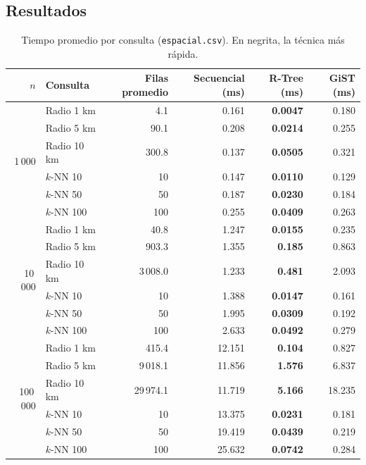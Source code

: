 \documentclass[11pt,a4paper]{article}
\begin{document}
\subsection{Resultados}

\begin{table}[H]
  \centering
  \small
  \begin{tabular}{@{}rlrrrr@{}}
    \toprule
    $n$ & Consulta & Filas promedio & Secuencial (ms) & R-Tree (ms) & GiST (ms) \\
    \midrule
    \multirow{6}{*}{1\,000}
      & Radio 1 km  & 4.1       & 0.161  & \textbf{0.0047} & 0.180 \\
      & Radio 5 km  & 90.1      & 0.208  & \textbf{0.0214} & 0.255 \\
      & Radio 10 km & 300.8     & 0.137  & \textbf{0.0505} & 0.321 \\
      & $k$-NN 10   & 10        & 0.147  & \textbf{0.0110} & 0.129 \\
      & $k$-NN 50   & 50        & 0.187  & \textbf{0.0230} & 0.184 \\
      & $k$-NN 100  & 100       & 0.255  & \textbf{0.0409} & 0.263 \\
    \midrule
    \multirow{6}{*}{10\,000}
      & Radio 1 km  & 40.8      & 1.247  & \textbf{0.0155} & 0.235 \\
      & Radio 5 km  & 903.3     & 1.355  & \textbf{0.185}  & 0.863 \\
      & Radio 10 km & 3\,008.0  & 1.233  & \textbf{0.481}  & 2.093 \\
      & $k$-NN 10   & 10        & 1.388  & \textbf{0.0147} & 0.161 \\
      & $k$-NN 50   & 50        & 1.995  & \textbf{0.0309} & 0.192 \\
      & $k$-NN 100  & 100       & 2.633  & \textbf{0.0492} & 0.279 \\
    \midrule
    \multirow{6}{*}{100\,000}
      & Radio 1 km  & 415.4     & 12.151 & \textbf{0.104}  & 0.827 \\
      & Radio 5 km  & 9\,018.1  & 11.856 & \textbf{1.576}  & 6.837 \\
      & Radio 10 km & 29\,974.1 & 11.719 & \textbf{5.166}  & 18.235 \\
      & $k$-NN 10   & 10        & 13.375 & \textbf{0.0231} & 0.181 \\
      & $k$-NN 50   & 50        & 19.419 & \textbf{0.0439} & 0.219 \\
      & $k$-NN 100  & 100       & 25.632 & \textbf{0.0742} & 0.284 \\
    \bottomrule
  \end{tabular}
  \caption{Tiempo promedio por consulta (\texttt{espacial.csv}). En negrita, la técnica más rápida.}
  \label{tab:espacial}
\end{table}
\end{document}
